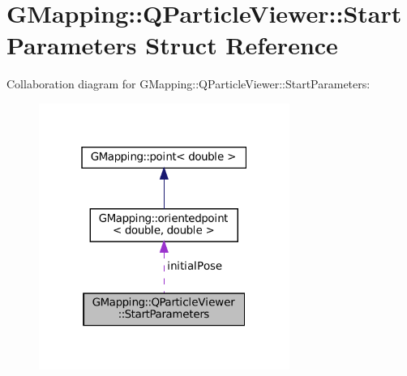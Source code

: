 \hypertarget{structGMapping_1_1QParticleViewer_1_1StartParameters}{}\section{G\+Mapping\+:\+:Q\+Particle\+Viewer\+:\+:Start\+Parameters Struct Reference}
\label{structGMapping_1_1QParticleViewer_1_1StartParameters}


Collaboration diagram for G\+Mapping\+:\+:Q\+Particle\+Viewer\+:\+:Start\+Parameters\+:
\nopagebreak
\begin{figure}[H]
\begin{center}
\leavevmode
\includegraphics[width=232pt]{structGMapping_1_1QParticleViewer_1_1StartParameters__coll__graph}
\end{center}
\end{figure}
